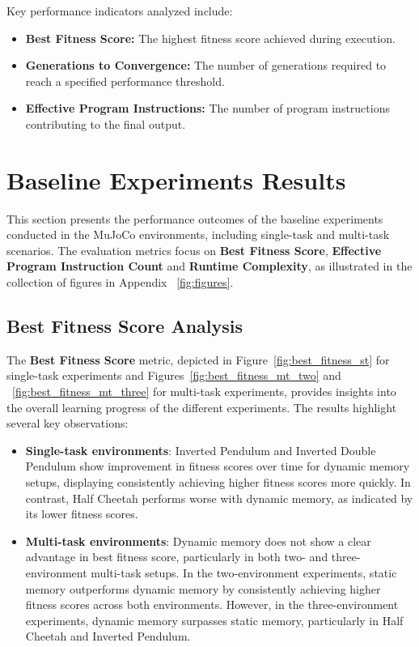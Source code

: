 \documentclass[sigconf]{acmart}
\begin{document}
Key performance indicators analyzed include:

\begin{itemize}
  \item \textbf{Best Fitness Score:} The highest fitness score achieved during execution.
  \item \textbf{Generations to Convergence:} The number of generations required to reach a specified performance threshold.
  \item \textbf{Effective Program Instructions:} The number of program instructions contributing to the final output.
\end{itemize}

\section{Baseline Experiments Results}
\label{sec:experiments}
This section presents the performance outcomes of the baseline experiments conducted in 
the MuJoCo environments, including single-task and multi-task scenarios. The evaluation 
metrics focus on \textbf{Best Fitness Score}, \textbf{Effective Program Instruction Count}
and \textbf{Runtime Complexity}, as illustrated in the collection of figures in Appendix 
~\ref{fig:figures}.

\subsection{Best Fitness Score Analysis}
The \textbf{Best Fitness Score} metric, depicted in Figure~\ref{fig:best_fitness_st} for single-task experiments and
Figures~\ref{fig:best_fitness_mt_two} and ~\ref{fig:best_fitness_mt_three} for multi-task experiments, provides insights into the overall 
learning progress of the different experiments. The results highlight several key observations:

\begin{itemize}
  \item \textbf{Single-task environments}: Inverted Pendulum and Inverted Double Pendulum show improvement in fitness scores over time for dynamic memory setups, displaying consistently achieving higher fitness scores more quickly. In contrast, Half Cheetah performs worse with dynamic memory, as indicated by its lower fitness scores.
  \item \textbf{Multi-task environments}: Dynamic memory does not show a clear advantage in best fitness score, particularly in both two- and three-environment multi-task setups. In the two-environment experiments, static memory outperforms dynamic memory by consistently achieving higher fitness scores across both environments. However, in the three-environment experiments, dynamic memory surpasses static memory, particularly in Half Cheetah and Inverted Pendulum.
\end{itemize}
\end{document}
